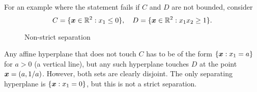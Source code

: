 \documentclass{article}
\begin{document}
For an example where the statement fails if $C$ and $D$ are not bounded, consider
\begin{equation*}
 C = \{\bm{x}\in \mathbb{R}^2 \mathrel{\mathop{:}} x_1\leq 0\}, \quad D=\{\bm{x}\in \mathbb{R}^2 \mathrel{\mathop{:}} x_1x_2\geq 1\}.
\end{equation*}
\begin{figure}[h!]
\centering
{}
\caption{Non-strict separation}
\end{figure}
Any affine hyperplane that does not touch $C$ has to be of the form $\{\bm{x}\mathrel{\mathop{:}} x_1=a\}$ for $a>0$ (a vertical line), but any such hyperplane touches $D$ at the point $\bm{x}=(a,1/a)$. However, both sets are clearly disjoint. The only separating hyperplane is $\{\bm{x}\mathrel{\mathop{:}} x_1=0\}$, but this is not a strict separation.
\end{document}
